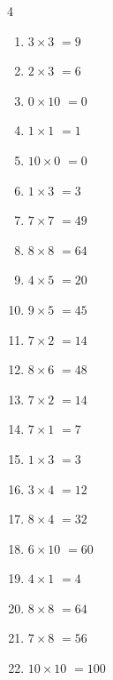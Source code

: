 \begin{multicols}{4}
\begin{enumerate}
  \item $3\times 3$
        $=9$

  \item $2\times 3$
        $=6$

  \item $0\times 10$
        $=0$

  \item $1\times 1$
        $=1$

  \item $10\times 0$
        $=0$

  \item $1\times 3$
        $=3$

  \item $7\times 7$
        $=49$

  \item $8\times 8$
        $=64$

  \item $4\times 5$
        $=20$

  \item $9\times 5$
        $=45$

  \item $7\times 2$
        $=14$

  \item $8\times 6$
        $=48$

  \item $7\times 2$
        $=14$

  \item $7\times 1$
        $=7$

  \item $1\times 3$
        $=3$

  \item $3\times 4$
        $=12$

  \item $8\times 4$
        $=32$

  \item $6\times 10$
        $=60$

\columnbreak %

\resetques

  \item $4\times 1$
        $=4$

  \item $8\times 8$
        $=64$

  \item $7\times 8$
        $=56$

  \item $10\times 10$
        $=100$


\end{enumerate}
\end{multicols}
